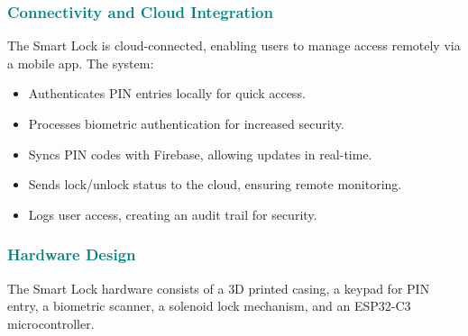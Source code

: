 \subsubsection{\textcolor{teal}{Connectivity and Cloud Integration}}

The Smart Lock is cloud-connected, enabling users to manage access remotely via a mobile app. The system:
\begin{itemize}
    \item Authenticates PIN entries locally for quick access.
    \item Processes biometric authentication for increased security.
    \item Syncs PIN codes with Firebase, allowing updates in real-time.
    \item Sends lock/unlock status to the cloud, ensuring remote monitoring.
    \item Logs user access, creating an audit trail for security.
\end{itemize}

\subsubsection{\textcolor{teal}{Hardware Design}}

The Smart Lock hardware consists of a 3D printed casing, a keypad for PIN entry, a biometric scanner, a solenoid lock mechanism, and an ESP32-C3 microcontroller.

